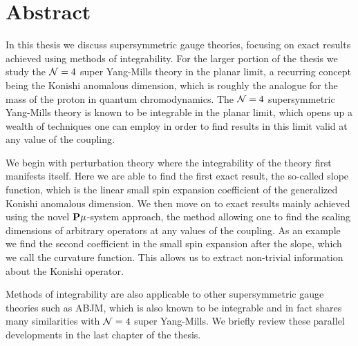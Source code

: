 
\section*{Abstract}

\vspace{30pt}




In this thesis we discuss supersymmetric gauge theories, focusing on exact results achieved using methods of integrability. 
For the larger portion of the thesis we study the $\mathcal{N}=4$ super Yang-Mills theory in the planar limit, a recurring concept being the Konishi anomalous dimension, which is roughly the analogue for the mass of the proton in quantum chromodynamics.
The $\mathcal{N}=4$ supersymmetric Yang-Mills theory is known to be integrable in the planar limit, which opens up a wealth of techniques one can employ in order to find results in this limit valid at any value of the coupling. 

We begin with perturbation theory where the integrability of the theory first manifests itself.
Here we are able to find the first exact result, the so-called slope function, which is the linear small spin expansion coefficient of the generalized Konishi anomalous dimension.
We then move on to exact results mainly achieved using the novel ${\bf P}\mu$-system approach, the method allowing one to find the scaling dimensions of arbitrary operators at any values of the coupling.
As an example we find the second coefficient in the small spin expansion after the slope, which we call the curvature function.
This allows us to extract non-trivial information about the Konishi operator.

Methods of integrability are also applicable to other supersymmetric gauge theories such as ABJM, which is also known to be integrable and in fact shares many similarities with $\mathcal{N}=4$ super Yang-Mills. We briefly review these parallel developments in the last chapter of the thesis.
